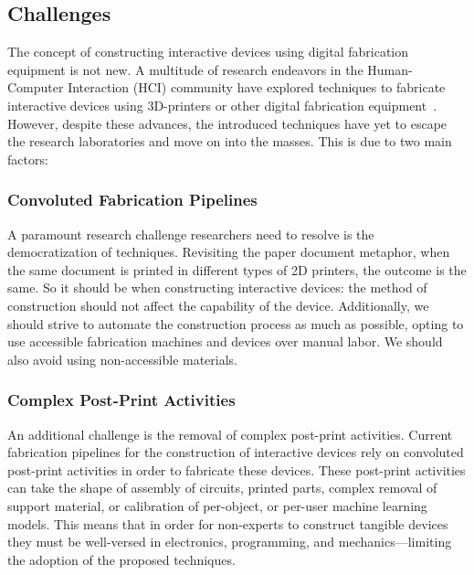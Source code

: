     \subsection{Challenges}
      The concept of constructing interactive devices using digital fabrication
      equipment is not new. A multitude of research endeavors in the
      Human-Computer Interaction (HCI) community have explored techniques to
      fabricate interactive devices using 3D-printers or other digital
      fabrication equipment~\cite{Ballagas:2018}. However, despite these
      advances, the introduced techniques have yet to escape the research
      laboratories and move on into the masses. This is due to two main factors:

      \subsubsection*{Convoluted Fabrication Pipelines}
        A paramount research challenge researchers need to resolve is the
        democratization of techniques. Revisiting the paper document metaphor,
        when the same document is printed in different types of 2D printers, the
        outcome is the same. So it should be when constructing interactive
        devices: the method of construction should not affect the capability of
        the device. Additionally, we should strive to automate the construction
        process as much as possible, opting to use accessible fabrication
        machines and devices over manual labor. We should also avoid using
        non-accessible materials.

      \subsubsection*{Complex Post-Print Activities}
        An additional challenge is the removal of complex post-print activities.
        Current fabrication pipelines for the construction of interactive
        devices rely on convoluted post-print activities in order to fabricate
        these devices. These post-print activities can take the shape of
        assembly of circuits, printed parts, complex removal of support
        material, or calibration of per-object, or per-user machine learning
        models. This means that in order for non-experts to construct tangible
        devices they must be well-versed in electronics, programming, and
        mechanics---limiting the adoption of the proposed techniques.
      
